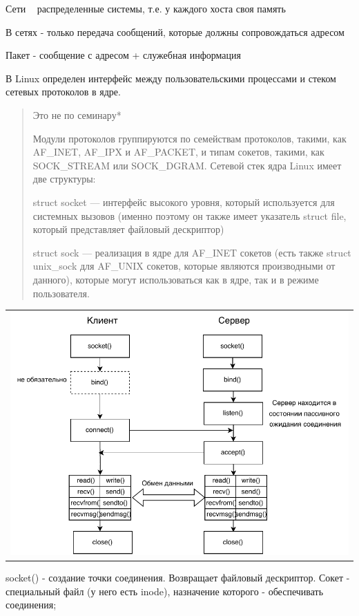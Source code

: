 Сети ~ распределенные системы, т.е. у каждого хоста своя память

В сетях - только передача сообщений, которые должны сопровождаться адресом

Пакет - сообщение с адресом + служебная информация 

В Linux определен интерфейс между пользовательскими процессами и стеком сетевых протоколов в ядре.

\begin{quote}
Это не по семинару*

Модули протоколов группируются по семействам протоколов, такими, как AF\_INET, AF\_IPX и AF\_PACKET, и типам сокетов, такими, как \\ SOCK\_STREAM или SOCK\_DGRAM. Сетевой стек ядра Linux имеет две структуры:

struct socket — интерфейс высокого уровня, который используется для системных вызовов (именно поэтому он также имеет указатель struct file, который представляет файловый дескриптор)

struct sock — реализация в ядре для AF\_INET сокетов (есть также struct unix\_sock для AF\_UNIX сокетов, которые являются производными от данного), которые могут использоваться как в ядре, так и в режиме пользователя.
\end{quote}

\begin{table}[H]
  \centering
  \begin{tabular}{p{1\linewidth}}
    \centering
    \includegraphics[width=0.8\linewidth]{./images/4.pdf}
  \end{tabular}
\end{table}

socket() - создание точки соединения. Возвращает файловый дескриптор. Сокет - специальный файл (у него есть inode), назначение которого - обеспечивать соединения;

